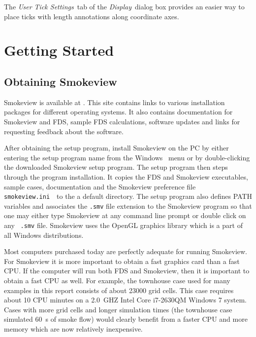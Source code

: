 \documentclass[11pt,twoside]{book}
\newcommand{\svini}{{\tt smokeview.ini}\ }
\begin{document}
The {\em User Tick Settings}\ tab of the {\em Display}\ dialog box
provides an easier way to place ticks with length annotations
along coordinate axes.



\section{Getting Started}

\subsection{Obtaining Smokeview}

Smokeview is available at {\bf {}}.
This site contains links to various installation packages for
different operating systems. It also contains documentation for
Smokeview and FDS, sample FDS calculations, software updates and
links for requesting feedback about the software.

After obtaining the setup program, install Smokeview  on the PC by
either entering the setup program name from the Windows
\ menu or by double-clicking the downloaded
Smokeview  setup program. The setup program then steps through the
program installation. It copies the FDS and Smokeview executables,
sample cases, documentation and the Smokeview preference file
\svini\ to the a default directory.  The setup program also
defines PATH variables and associates the {\tt .smv} file
extension to the Smokeview program so that one may either type
Smokeview at any command line prompt or double click on any {\tt
.smv} file. Smokeview uses the OpenGL graphics library which is a
part of all Windows distributions.

Most computers purchased today are perfectly adequate for running
Smokeview. For Smokeview it is more important to obtain a fast
graphics card than a fast CPU. If the computer will run both FDS
and Smokeview, then it is important to obtain a fast CPU as well.
For example, the townhouse case used for many examples in this
report consists of about 23000 grid cells.  This case requires
about 10 CPU minutes on a 2.0~GHZ Intel Core i7-2630QM Windows 7
system. Cases with more grid cells and longer simulation times
(the townhouse case simulated 60~s of smoke flow) would clearly
benefit from a faster CPU and more memory which are now relatively
inexpensive.
\end{document}
